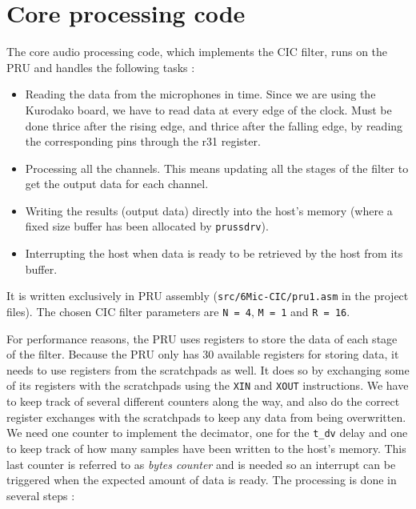 \documentclass[]{report}
\providecommand{\tightlist}{%
	\setlength{\itemsep}{0pt}\setlength{\parskip}{0pt}}
\begin{document}
\hypertarget{core-processing-code}{%
\section{Core processing code}\label{core-processing-code}}

The core audio processing code, which implements the CIC filter, runs on the PRU and handles the following tasks :

\begin{itemize}
\tightlist
\item
  Reading the data from the microphones in time. Since we are using the Kurodako board, we have to read data at every edge of the clock. Must be done thrice after the rising edge, and thrice after the falling edge, by reading the corresponding pins through the r31 register.
\item
  Processing all the channels. This means updating all the stages of the filter to get the output data for each channel.
\item
  Writing the results (output data) directly into the host's memory (where a fixed size buffer has been allocated by \texttt{prussdrv}).
\item
  Interrupting the host when data is ready to be retrieved by the host from its buffer.
\end{itemize}

It is written exclusively in PRU assembly (\texttt{src/6Mic-CIC/pru1.asm} in the project files). The chosen CIC filter parameters are \texttt{N~=~4}, \texttt{M = 1} and \texttt{R = 16}.

For performance reasons, the PRU uses registers to store the data of each stage of the filter. Because the PRU only has 30 available registers for storing data, it needs to use registers from the scratchpads as well. It does so by exchanging some of its registers with the scratchpads using the \texttt{XIN} and \texttt{XOUT} instructions. We have to keep track of several different counters along the way, and also do the correct register exchanges with the scratchpads to keep any data from being overwritten. We need one counter to implement the decimator, one for the \texttt{t\_dv} delay and one to keep track of how many samples have been written to the host's memory. This last counter is referred to as \emph{bytes counter} and is needed so an interrupt can be triggered when the expected amount of data is ready. The processing is done in several steps :
\end{document}
